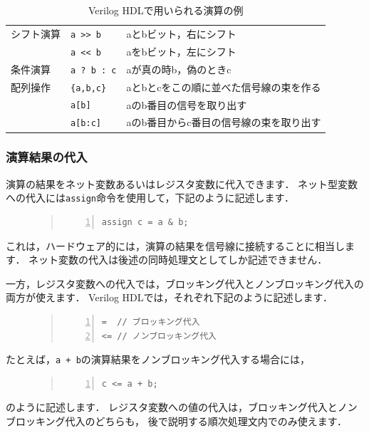 \documentclass[a4paper,dvipdfmx]{jsarticle}
\begin{document}
\begin{table}[H]
\begin{center}
\begin{tabular}{l|l|l}
   シフト演算    & \verb|a >> b|    & aとbビット，右にシフト \\\cline{2-3}
                 & \verb|a << b|    & aをbビット，左にシフト \\\hline
   条件演算      & \verb|a ? b : c| & aが真の時b，偽のときc \\\hline
   配列操作      & \verb|{a,b,c}|   & aとbとcをこの順に並べた信号線の束を作る \\\cline{2-3}
                 & \verb|a[b] |     & aのb番目の信号を取り出す \\\cline{2-3}
                 & \verb|a[b:c]|    & aのb番目からc番目の信号線の束を取り出す \\\hline
 \end{tabular}
\end{center}
\caption{Verilog HDLで用いられる演算の例\label{tbl:verilog_operator}}
\end{table}

\subsubsection{演算結果の代入}
演算の結果をネット変数あるいはレジスタ変数に代入できます．
ネット型変数への代入には\verb|assign|命令を使用して，下記のように記述します．
\begin{figure}[H]
\begin{quote}
\begin{Verbatim}[frame=single, numbers=left, baselinestretch=0.8]
assign c = a & b;
\end{Verbatim}
\end{quote}
\end{figure}
これは，ハードウェア的には，演算の結果を信号線に接続することに相当します．
ネット変数の代入は後述の同時処理文としてしか記述できません．

一方，レジスタ変数への代入では，ブロッキング代入とノンブロッキング代入の両方が使えます．
Verilog HDLでは，それぞれ下記のように記述します．
\begin{figure}[H]
\begin{quote}
\begin{Verbatim}[frame=single, numbers=left, baselinestretch=0.8]
=  // ブロッキング代入
<= // ノンブロッキング代入
\end{Verbatim}
\end{quote}
\end{figure}
たとえば，\verb|a + b|の演算結果をノンブロッキング代入する場合には，
\begin{figure}[H]
\begin{quote}
\begin{Verbatim}[frame=single, numbers=left, baselinestretch=0.8]
c <= a + b;
\end{Verbatim}
\end{quote}
\end{figure}
のように記述します．
レジスタ変数への値の代入は，ブロッキング代入とノンブロッキング代入のどちらも，
後で説明する順次処理文内でのみ使えます．
\end{document}
